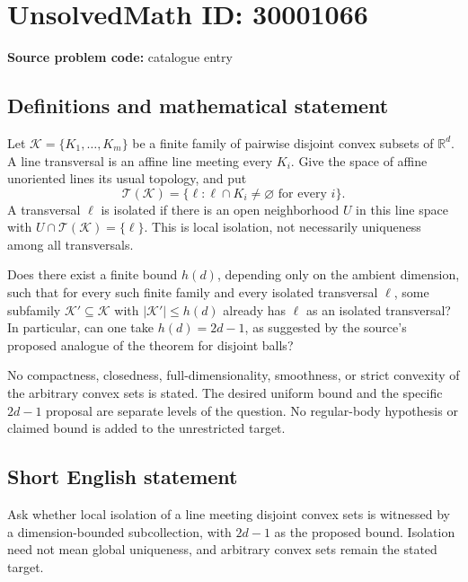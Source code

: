 \documentclass[11pt]{article}
\newcommand{\R}{\mathbb{R}}
\begin{document}
\section*{UnsolvedMath ID: 30001066}
\textbf{Source problem code:} catalogue entry
\subsection{Definitions and mathematical statement}
Let \(\mathcal K=\{K_1,\ldots,K_m\}\) be a finite family of pairwise disjoint convex subsets of \(\R^d\). A line transversal is an affine line meeting every \(K_i\). Give the space of affine unoriented lines its usual topology, and put
\[
\mathcal T(\mathcal K)=\{\ell:\ell\cap K_i\ne\varnothing\text{ for every }i\}.
\]
A transversal \(\ell\) is isolated if there is an open neighborhood \(U\) in this line space with \(U\cap\mathcal T(\mathcal K)=\{\ell\}\). This is local isolation, not necessarily uniqueness among all transversals.

Does there exist a finite bound \(h(d)\), depending only on the ambient dimension, such that for every such finite family and every isolated transversal \(\ell\), some subfamily \(\mathcal K'\subseteq\mathcal K\) with \(|\mathcal K'|\leq h(d)\) already has \(\ell\) as an isolated transversal? In particular, can one take \(h(d)=2d-1\), as suggested by the source's proposed analogue of the theorem for disjoint balls?

No compactness, closedness, full-dimensionality, smoothness, or strict convexity of the arbitrary convex sets is stated. The desired uniform bound and the specific \(2d-1\) proposal are separate levels of the question. No regular-body hypothesis or claimed bound is added to the unrestricted target.
\subsection{Short English statement}
Ask whether local isolation of a line meeting disjoint convex sets is witnessed by a dimension-bounded subcollection, with \(2d-1\) as the proposed bound. Isolation need not mean global uniqueness, and arbitrary convex sets remain the stated target.
\end{document}
